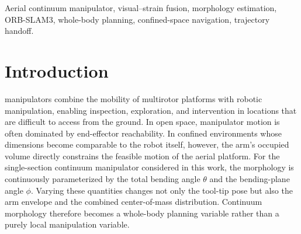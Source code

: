 \documentclass[journal,twoside]{IEEEtran}
\newcommand{\compactbody}{\fontsize{9.7}{11.2}\selectfont}
\begin{document}
\begin{abstract}
In 90 paired PX4/Gazebo closed-loop scenarios, the proposed Rolling-WB planner completes 89/90 tasks, corresponding to a 98.9\% success rate and a 23.3-percentage-point improvement over the best baseline. In hard scenarios, the success rate reaches 96.7\%, compared with 40.0\% for the best baseline. The planning-time P95 is 3.70~s with no planning deadline miss. A paired handoff ablation further shows a 72.8\% reduction in median translational jerk per unit path length relative to position-only switching. Staged visual-degradation tests additionally show that fusion weights migrate smoothly toward the strain branch when ORB observations deteriorate or fail.
\end{abstract}

\begin{IEEEkeywords}
Aerial continuum manipulator, visual--strain fusion, morphology estimation, ORB-SLAM3, whole-body planning, confined-space navigation, trajectory handoff.
\end{IEEEkeywords}

\compactbody

\section{Introduction}

 manipulators combine the mobility of multirotor platforms with robotic manipulation, enabling inspection, exploration, and intervention in locations that are difficult to access from the ground. In open space, manipulator motion is often dominated by end-effector reachability. In confined environments whose dimensions become comparable to the robot itself, however, the arm's occupied volume directly constrains the feasible motion of the aerial platform. For the single-section continuum manipulator considered in this work, the morphology is continuously parameterized by the total bending angle $\theta$ and the bending-plane angle $\phi$. Varying these quantities changes not only the tool-tip pose but also the arm envelope and the combined center-of-mass distribution. Continuum morphology therefore becomes a whole-body planning variable rather than a purely local manipulation variable.
\end{document}
